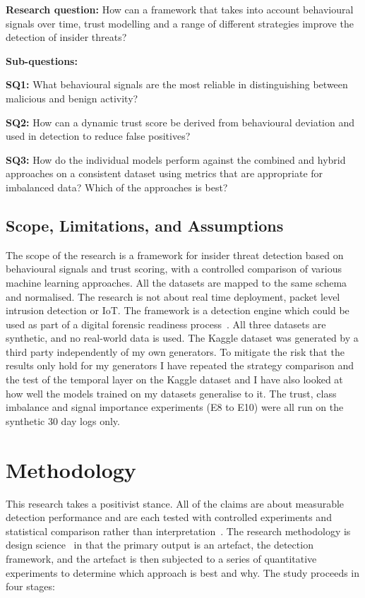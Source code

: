 \documentclass[a4paper,12pt]{article}
\begin{document}
\textbf{Research question:} How can a framework that takes into account behavioural signals over time, trust modelling and a range of different strategies improve the detection of insider threats?

\textbf{Sub-questions:}

\textbf{SQ1:} What behavioural signals are the most reliable in distinguishing between malicious and benign activity?

\textbf{SQ2:} How can a dynamic trust score be derived from behavioural deviation and used in detection to reduce false positives?

\textbf{SQ3:} How do the individual models perform against the combined and hybrid approaches on a consistent dataset using metrics that are appropriate for imbalanced data? Which of the approaches is best?

\subsection{Scope, Limitations, and Assumptions}
\label{sec:2.1}

The scope of the research is a framework for insider threat detection based on behavioural signals and trust scoring, with a controlled comparison of various machine learning approaches. All the datasets are mapped to the same schema and normalised. The research is not about real time deployment, packet level intrusion detection or IoT. The framework is a detection engine which could be used as part of a digital forensic readiness process~\cite{reddy2013,shoderu2025,makura2021}. All three datasets are synthetic, and no real-world data is used. The Kaggle dataset was generated by a third party independently of my own generators. To mitigate the risk that the results only hold for my generators I have repeated the strategy comparison and the test of the temporal layer on the Kaggle dataset and I have also looked at how well the models trained on my datasets generalise to it. The trust, class imbalance and signal importance experiments (E8 to E10) were all run on the synthetic 30 day logs only.

\section{Methodology}
\label{sec:3}

This research takes a positivist stance. All of the claims are about measurable detection performance and are each tested with controlled experiments and statistical comparison rather than interpretation~\cite{olivier2009}. The research methodology is design science~\cite{hevner2004} in that the primary output is an artefact, the detection framework, and the artefact is then subjected to a series of quantitative experiments to determine which approach is best and why. The study proceeds in four stages:
\end{document}
